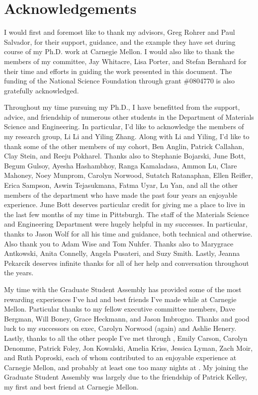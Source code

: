 \chapter{Acknowledgements}

I would first and foremost like to thank my advisors, Greg Rohrer and 
Paul Salvador, for their support, guidance, and the example they have set 
during course of my Ph.D. work at Carnegie Mellon. I would also like to 
thank the members of my committee, Jay Whitacre, Lisa Porter, and Stefan 
Bernhard for their time and efforts in guiding the work presented 
in this document. The funding of the National Science Foundation through 
grant \#0804770 is also gratefully acknowledged.

Throughout my time pursuing my Ph.D., I have benefitted from the support, 
advice, and friendship of numerous other students in the Department of 
Materials Science and Engineering. In particular, I'd like to acknowledge 
the members of my research group, Li Li and Yiling Zhang. Along with Li 
and Yiling, I'd like to thank some of the other members of my cohort, Ben 
Anglin, Patrick Callahan, Clay Stein, and Reeju Pokharel. Thanks also to 
Stephanie Bojarski, June Bott, Begum Gulsoy, Ayesha Hashambhoy, Ranga 
Kamaladasa, Ammon Lu, Clare Mahoney, Noey Munprom, Carolyn Norwood, 
Sutatch Ratanaphan, Ellen Reifler, Erica Sampson, Aswin Tejasukmana, 
Fatma Uyar, Lu Yan, and all the other members of the department who have 
made the past four years an enjoyable experience. June Bott deserves 
particular credit for giving me a place to live in the last few months of 
my time in Pittsburgh. The staff of the Materials Science and Engineering 
Department were hugely helpful in my successes. In particular, thanks to 
Jason Wolf for all his time and guidance, both technical and otherwise. 
Also thank you to Adam Wise and Tom Nuhfer. Thanks also to Marygrace 
Antkowski, Anita Connelly, Angela Pusateri, and Suzy Smith. Lastly, 
Jeanna Pekarcik deserves infinite thanks for all of her help and 
conversation throughout the years.

My time with the Graduate Student Assembly has provided some of the most 
rewarding experiences I've had and best friends I've made while at Carnegie 
Mellon. Particular thanks to my fellow  executive committee 
members, Dave Bergman, Will Boney, Grace Heckmann, and Jason Imbrogno. 
Thanks and good luck to my successors on  exec, Carolyn Norwood 
(again) and Ashlie Henery. Lastly, thanks to all the other people I've met 
through , Emily Carson, Carolyn Denomme, Patrick Foley, Jon 
Kowalski, Amelia Kriss, Jessica Lyman, Zach Moir, and Ruth Poproski, each of 
whom contributed to an enjoyable experience at Carnegie Mellon, and probably 
at least one too many nights at . My joining the Graduate Student 
Assembly was largely due to the friendship of Patrick Kelley, my first and 
best friend at Carnegie Mellon. 


